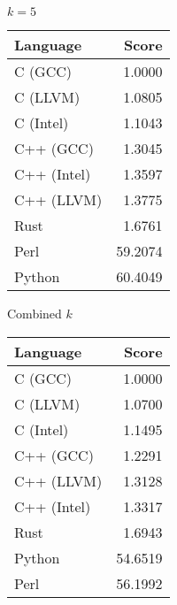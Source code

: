 \begin{subtable}{0.33\textwidth}
    \centering
    \caption{$k=5$}
    \label{table:runtime:dfa_gap(5)}
    \begin{tabular}{|l|r|}
        \hline
        Language & Score \\
        \hline
        C (GCC) & 1.0000 \\
        C (LLVM) & 1.0805 \\
        C (Intel) & 1.1043 \\
        C++ (GCC) & 1.3045 \\
        C++ (Intel) & 1.3597 \\
        C++ (LLVM) & 1.3775 \\
        Rust & 1.6761 \\
        Perl & 59.2074 \\
        Python & 60.4049 \\
        \hline
    \end{tabular}
\end{subtable}%
\begin{subtable}{0.33\textwidth}
    \centering
    \caption{Combined $k$}
    \label{table:runtime:dfa_gap:combined}
    \begin{tabular}{|l|r|}
        \hline
        Language & Score \\
        \hline
        C (GCC) & 1.0000 \\
        C (LLVM) & 1.0700 \\
        C (Intel) & 1.1495 \\
        C++ (GCC) & 1.2291 \\
        C++ (LLVM) & 1.3128 \\
        C++ (Intel) & 1.3317 \\
        Rust & 1.6943 \\
        Python & 54.6519 \\
        Perl & 56.1992 \\
        \hline
    \end{tabular}
\end{subtable}